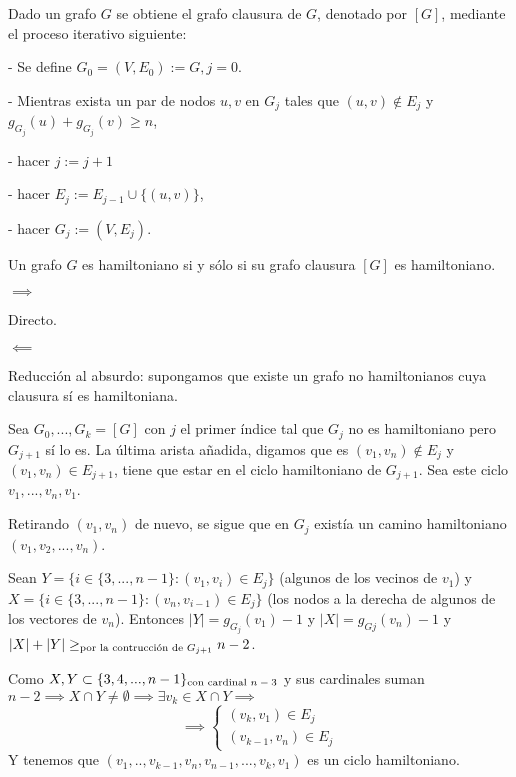 \documentclass[openany]{book}
\begin{document}
Dado un grafo $G$ se obtiene el grafo clausura de $G$, denotado por $[G]$, mediante el proceso iterativo siguiente:

- Se define $G_{0}=\left(V, E_{0}\right):=G, j=0$.

- Mientras exista un par de nodos $u, v$ en $G_{j}$ tales que $(u, v) \notin E_{j}$ y $g_{G_{j}}(u)+g_{G_{j}}(v) \geq n$,

- hacer $j:=j+1$

- hacer $E_{j}:=E_{j-1} \cup\{(u, v)\}$,

- hacer $G_{j}:=\left(V, E_{j}\right)$.

\begin{theorem}
  Un grafo $G$ es hamiltoniano si y sólo si su grafo clausura $[G]$ es hamiltoniano.
\end{theorem}


\begin{demonstration}

    $ \implies $

    Directo.

    $ \impliedby $

    Reducción al absurdo: supongamos que existe un grafo no hamiltonianos cuya clausura sí es hamiltoniana.

    Sea $ G_0,...,G_k = [G] $ con $ j $ el primer índice tal que $ G_{j} $ no es hamiltoniano pero $ G_{j+1} $ sí lo es. La última arista añadida, digamos que es $ (v_1,v_n) \not \in E_j $ y $ (v_1,v_n) \in E_{j+1} $, tiene que estar en el ciclo hamiltoniano de $ G_{j+1} $. Sea este ciclo $ v_1,...,v_n,v_1 $.

    Retirando $ (v_1,v_n) $ de nuevo, se sigue que en $ G_j $ existía un camino hamiltoniano $ (v_1,v_2,...,v_n) $.

    Sean $ Y = \{i \in \{3,...,n-1\} : (v_1,v_i) \in E_j\} $ (algunos de los vecinos de $ v_1 $) y $ X = \{i \in \{3,...,n-1\}:(v_n,v_{i-1}) \in E_j\} $ (los nodos a la derecha de algunos de los vectores de $ v_n $). Entonces $ |Y| = g_{G_j}(v_1) -1$ y $ |X| = g_{Gj}(v_n)-1 $ y $ |X| + |Y| \geq_{\text{por la contrucción de $ G_{j+1} $}} n-2  $.

    Como $ X,Y \subset \{3,4,...,n-1\}_{\text{con cardinal $ n-3 $}} $ y sus cardinales suman $ n-2 \implies X \cap Y \ne \emptyset \implies \exists v_{k} \in X \cap Y \implies $
    $$ \implies \left\{
    \begin{array}{l}
        (v_{k},v_1) \in E_j\\
        (v_{k-1},v_n) \in E_j
    \end{array}
    \right. $$
    Y tenemos que $ (v_1,..,v_{k-1},v_{n},v_{n-1},...,v_{k},v_{1}) $ es un ciclo hamiltoniano.
\end{demonstration}
\end{document}
